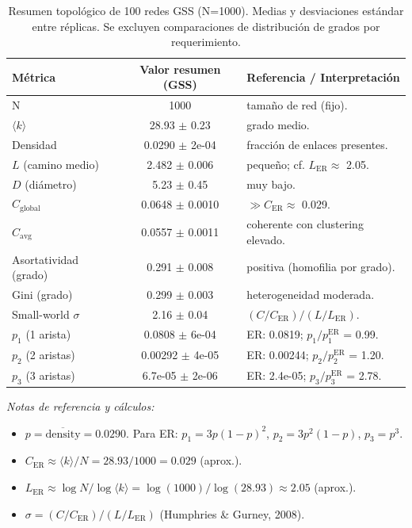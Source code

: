 \documentclass[11pt]{article}
\begin{document}
\begin{table}[ht]
\centering
\caption{Resumen topológico de 100 redes GSS (N=1000). Medias y desviaciones estándar entre réplicas. Se excluyen comparaciones de distribución de grados por requerimiento.}
\vspace{0.5em}
\begin{tabular}{l@{\hspace{1em}}c@{\hspace{3em}}l}
\toprule
\textbf{Métrica} & \textbf{Valor resumen (GSS)} & \textbf{Referencia / Interpretación} \\
\midrule
N & 1000 & tamaño de red (fijo). \\
$\langle k \rangle$ & 28.93 $\pm$ 0.23 & grado medio. \\
Densidad & 0.0290 $\pm$ 2e-04 & fracción de enlaces presentes. \\
$L$ (camino medio) & 2.482 $\pm$ 0.006 & pequeño; cf. $L_{\mathrm{ER}}\approx$ 2.05. \\
$D$ (diámetro) & 5.23 $\pm$ 0.45 & muy bajo. \\
$C_{\mathrm{global}}$ & 0.0648 $\pm$ 0.0010 & $\gg C_{\mathrm{ER}}\approx$ 0.029. \\
$C_{\mathrm{avg}}$ & 0.0557 $\pm$ 0.0011 & coherente con clustering elevado. \\
Asortatividad (grado) & 0.291 $\pm$ 0.008 & positiva (homofilia por grado). \\
Gini (grado) & 0.299 $\pm$ 0.003 & heterogeneidad moderada. \\
Small-world $\sigma$ & 2.16 $\pm$ 0.04 & $(C/C_{\mathrm{ER}})/(L/L_{\mathrm{ER}})$. \\
\midrule
$p_1$ (1 arista) & 0.0808 $\pm$ 6e-04 & ER: 0.0819; $p_1/p_1^{\mathrm{ER}}$ = 0.99. \\
$p_2$ (2 aristas) & 0.00292 $\pm$ 4e-05 & ER: 0.00244; $p_2/p_2^{\mathrm{ER}}$ = 1.20. \\
$p_3$ (3 aristas) & 6.7e-05 $\pm$ 2e-06 & ER: 2.4e-05; $p_3/p_3^{\mathrm{ER}}$ = 2.78. \\
\bottomrule
\end{tabular}
\vspace{0.75em}
\captionsetup{justification=raggedright,singlelinecheck=false}
\small \textit{Notas de referencia y cálculos:}
\begin{itemize}
\item $p=\overline{\text{density}}= 0.0290$. Para ER: $p_1=3p(1-p)^2$, $p_2=3p^2(1-p)$, $p_3=p^3$.
\item $C_{\mathrm{ER}}\approx \langle k \rangle/N = 28.93 / 1000 = 0.029$ (aprox.).
\item $L_{\mathrm{ER}}\approx \log N / \log \langle k \rangle = \log(1000)/\log(28.93) \approx 2.05$ (aprox.).
\item $\sigma = (C/C_{\mathrm{ER}})/(L/L_{\mathrm{ER}})$ (Humphries \& Gurney, 2008).
\end{itemize}
\end{table}
\end{document}
